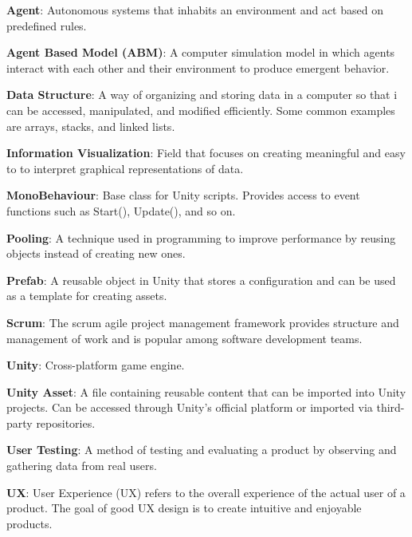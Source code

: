 
\noindent
\label{itm:agent}\textbf{Agent}: Autonomous systems that inhabits an environment and act based on predefined rules.

\noindent
\label{itm:abm}\textbf{Agent Based Model (ABM)}: A computer simulation model in which agents interact with each other and their environment to produce emergent behavior. 

\noindent
\label{itm:data-structure}\textbf{Data Structure}: A way of organizing and storing data in a computer so that i can be accessed, manipulated, and modified efficiently. Some common examples are arrays, stacks, and linked lists. 

\noindent
\label{itm:information-visualization}\textbf{Information Visualization}: Field that focuses on creating meaningful and easy to to interpret graphical representations of data.

\noindent
\label{itm:monobehaviour}\textbf{MonoBehaviour}: Base class for Unity scripts. Provides access to event functions such as Start(), Update(), and so on.

\noindent
\label{itm:pooling}\textbf{Pooling}: A technique used in programming to improve performance by reusing objects instead of creating new ones. 

\noindent
\label{itm:prefab}\textbf{Prefab}: A reusable object in Unity that stores a configuration and can be used as a template for creating assets.

\noindent
\label{itm:scrum}\textbf{Scrum}: The scrum agile project management framework provides structure and management of work and is popular among software development teams.

\noindent
\label{itm:unity}\textbf{Unity}: Cross-platform game engine.

\noindent
\label{itm:unity-asset}\textbf{Unity Asset}: A file  containing reusable content that can be imported into Unity projects. Can be accessed through Unity's official platform or imported via third-party repositories. 

\noindent
\label{itm:user-testing}\textbf{User Testing}: A method of testing and evaluating a product by observing and gathering data from real users. 

\noindent
\label{itm:ux}\textbf{UX}: User Experience (UX) refers to the overall experience of the actual user of a product. The goal of good UX design is to create intuitive and enjoyable products.











